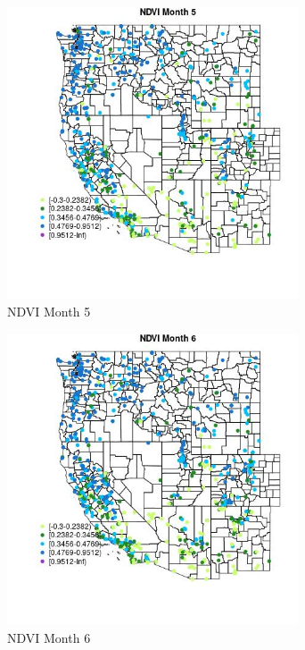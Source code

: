 \begin{figure} 
\centering  
\includegraphics[width=0.77\textwidth]{Code_Outputs/Report_ML_input_PM25_Step4_part_f_de_duplicated_aveswNAs_MapObsMo5NDVI.jpg} 
\caption{\label{fig:Report_ML_input_PM25_Step4_part_f_de_duplicated_aveswNAsMapObsMo5NDVI}NDVI Month 5} 
\end{figure} 
 

\begin{figure} 
\centering  
\includegraphics[width=0.77\textwidth]{Code_Outputs/Report_ML_input_PM25_Step4_part_f_de_duplicated_aveswNAs_MapObsMo6NDVI.jpg} 
\caption{\label{fig:Report_ML_input_PM25_Step4_part_f_de_duplicated_aveswNAsMapObsMo6NDVI}NDVI Month 6} 
\end{figure} 
 

